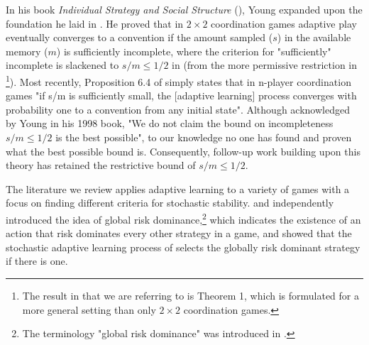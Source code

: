 \documentclass[11.5pt]{article}
\begin{document}
In his book \emph{Individual Strategy and Social Structure} (\cite{Young1998}),
 Young expanded upon the foundation he laid in \cite{young1993evolution}. He proved that in 
$2\times 2$ coordination games adaptive play eventually converges to a convention if the amount sampled ($s$) in the available memory ($m$) is sufficiently incomplete, where the criterion for "sufficiently" incomplete is slackened to $s/m \leq 1/2$ in \cite{Young1998} (from the more permissive restriction in \cite{young1993evolution}\footnote{The result in \cite{young1993evolution} that we are referring to is Theorem 1, which is formulated for a more general setting than only $2\times 2$ coordination games.}). 
%
Most recently, Proposition 6.4 of \cite{WALLACE2015327} simply states that in n-player coordination games "if s/m is sufficiently small, the [adaptive learning] process converges with probability one to a convention from any initial state". 
Although acknowledged by Young in his 1998 book, "We do not claim the bound on incompleteness $s/m \leq 1/2$ is the best possible", to our knowledge no one has found and proven what the best possible bound is. Consequently, follow-up work building upon this theory has retained the restrictive bound of $s/m \leq 1/2$. 

The literature we review applies adaptive learning to a variety of games with a focus on finding different criteria for stochastic stability. \cite{maruta1997relationship} and \cite{ellison2000basins} independently introduced the idea of global risk dominance,\footnote{The terminology "global risk dominance" was introduced in \cite{maruta1997relationship}.}  which indicates the existence of an action that risk dominates every other strategy in a game, and showed that the stochastic adaptive learning process of \cite{young1993evolution} selects the globally risk dominant strategy if there is one.
\end{document}
